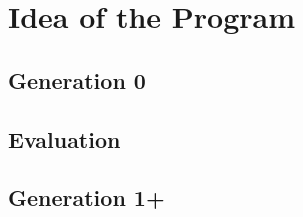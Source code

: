 \chapter{Idea of the Program}
\label{cha:program_idea}



\section{Generation 0} %
\label{sec:generation_0}



\section{Evaluation} %
\label{sec:evaluation}



\section{Generation 1+} %
\label{sec:generation_1+}
